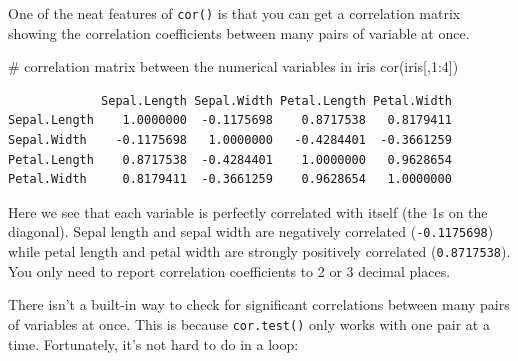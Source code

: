 \documentclass[
  13,
  letterpaper,
]{report}
\newenvironment{Shaded}{\begin{snugshade}}{\end{snugshade}}
\newcommand{\CommentTok}[1]{\textcolor[rgb]{0.37,0.37,0.37}{#1}}
\newcommand{\DecValTok}[1]{\textcolor[rgb]{0.68,0.00,0.00}{#1}}
\newcommand{\FunctionTok}[1]{\textcolor[rgb]{0.28,0.35,0.67}{#1}}
\newcommand{\NormalTok}[1]{\textcolor[rgb]{0.00,0.23,0.31}{#1}}
\newcommand{\SpecialCharTok}[1]{\textcolor[rgb]{0.37,0.37,0.37}{#1}}
\begin{document}
One of the neat features of \texttt{cor()} is that you can get a
correlation matrix showing the correlation coefficients between many
pairs of variable at once.

\begin{Shaded}
\begin{Highlighting}[]
\CommentTok{\# correlation matrix between the numerical variables in iris}
\FunctionTok{cor}\NormalTok{(iris[,}\DecValTok{1}\SpecialCharTok{:}\DecValTok{4}\NormalTok{])}
\end{Highlighting}
\end{Shaded}

\begin{verbatim}
             Sepal.Length Sepal.Width Petal.Length Petal.Width
Sepal.Length    1.0000000  -0.1175698    0.8717538   0.8179411
Sepal.Width    -0.1175698   1.0000000   -0.4284401  -0.3661259
Petal.Length    0.8717538  -0.4284401    1.0000000   0.9628654
Petal.Width     0.8179411  -0.3661259    0.9628654   1.0000000
\end{verbatim}

Here we see that each variable is perfectly correlated with itself (the
1s on the diagonal). Sepal length and sepal width are negatively
correlated (\texttt{-0.1175698}) while petal length and petal width are
strongly positively correlated (\texttt{0.8717538}). You only need to
report correlation coefficients to 2 or 3 decimal places.

There isn't a built-in way to check for significant correlations between
many pairs of variables at once. This is because \texttt{cor.test()}
only works with one pair at a time. Fortunately, it's not hard to do in
a loop:
\end{document}
